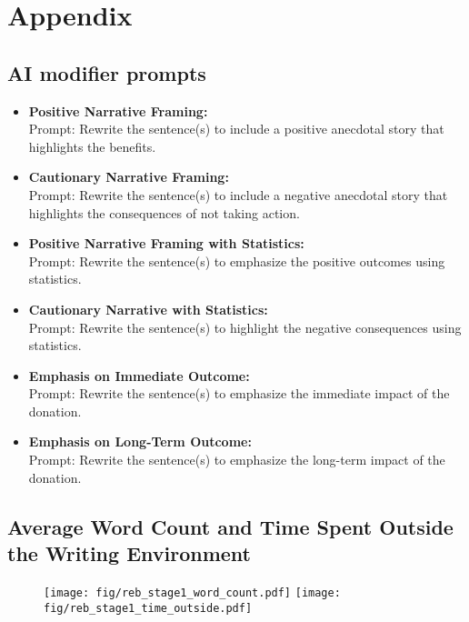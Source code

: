 \section{Appendix}
\label{Appendix}


\subsection{AI modifier prompts}
\label{subsec:ai_modifier_prompt}
\begin{itemize}
    \item \textbf{Positive Narrative Framing:} \\
    Prompt: Rewrite the sentence(s) to include a positive anecdotal story that highlights the benefits.
    
    \item \textbf{Cautionary Narrative Framing:} \\
    Prompt: Rewrite the sentence(s) to include a negative anecdotal story that highlights the consequences of not taking action.
    
    \item \textbf{Positive Narrative Framing with Statistics:} \\
    Prompt: Rewrite the sentence(s) to emphasize the positive outcomes using statistics.
    
    \item \textbf{Cautionary Narrative with Statistics:} \\
    Prompt: Rewrite the sentence(s) to highlight the negative consequences using statistics.
    
    \item \textbf{Emphasis on Immediate Outcome:} \\
    Prompt: Rewrite the sentence(s) to emphasize the immediate impact of the donation.
    
    \item \textbf{Emphasis on Long-Term Outcome:} \\
    Prompt: Rewrite the sentence(s) to emphasize the long-term impact of the donation.
\end{itemize}



\subsection{Average Word Count and Time Spent Outside the Writing Environment}
\begin{figure}[H]
    \centering
    \texttt{[image: fig/reb\_stage1\_word\_count.pdf]}
    \texttt{[image: fig/reb\_stage1\_time\_outside.pdf]}
    
    \caption{}
    \label{fig:stage1_word_count}
\end{figure}




